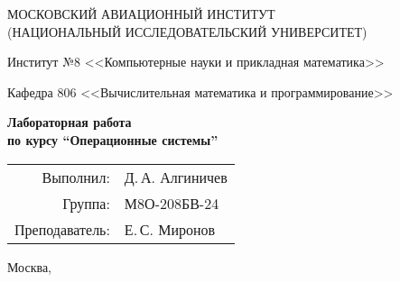 \begin{titlepage}
\begin{center}
\large
МОСКОВСКИЙ АВИАЦИОННЫЙ ИНСТИТУТ\\ (НАЦИОНАЛЬНЫЙ ИССЛЕДОВАТЕЛЬСКИЙ УНИВЕРСИТЕТ)

\vspace{20pt}

Институт №8 <<Компьютерные науки и прикладная математика>>

Кафедра 806 <<Вычислительная математика и программирование>>
\end{center}

\vspace{60pt}

\begin{center}
\bfseries
\large
Лабораторная работа  \\по курсу \enquote{Операционные системы}

\vspace{54pt}

\end{center}

\vfill

\begin{flushright}
\large
\begin{tabular}{rl}
Выполнил: & Д.\,А. Алгиничев \\
Группа: & М8О-208БВ-24 \\
Преподаватель: & Е.\,С. Миронов \\
\end{tabular}
\end{flushright}

\vspace{92pt}

\begin{center}
\large
Москва, \the\year
\end{center}
\end{titlepage}

\pagebreak
